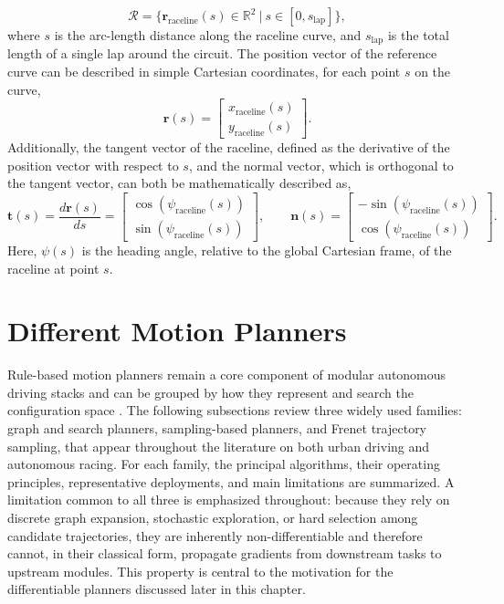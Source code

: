 \begin{equation}
    \mathcal{R} = \{ \textbf{r}_{\text{raceline}}(s) \in \mathbb{R}^2 \ | \ s \in [0, s_{\text{lap}}]\},
\end{equation}
where $s$ is the arc-length distance along the raceline curve, and $s_{\text{lap}}$ is the total length of a single lap around the circuit. 
The position vector of the reference curve can be described in simple Cartesian coordinates, for each point $s$ on the curve,
\begin{equation}
    \textbf{r}(s) = \begin{bmatrix}
        x_{\text{raceline}} (s) \\ y_{\text{raceline}} (s)
    \end{bmatrix}.
\end{equation}
Additionally, the tangent vector of the raceline, defined as the derivative of the position vector with respect to $s$, and the normal vector, which is orthogonal to the tangent vector, can both be mathematically described as,
\begin{equation}
    \textbf{t}(s) = \frac{d \textbf{r}(s)}{d s} = \begin{bmatrix} \cos (  \psi_{\text{raceline}}(s)) \\ \sin (\psi_{\text{raceline}}(s)) \end{bmatrix}, \qquad
    \textbf{n}(s) = \begin{bmatrix} - \sin (\psi_{\text{raceline}}(s)) \\ \cos (\psi_{\text{raceline}}(s)) \end{bmatrix}.
\end{equation}
Here, $\psi(s)$ is the heading angle, relative to the global Cartesian frame, of the raceline at point $s$.

\section{Different Motion Planners}
\label{section:DifferentMotionPlanners}

Rule-based motion planners remain a core component of modular autonomous driving stacks and can be grouped by how they represent and search the configuration space \cite{gonzalez_ReviewMotionPlanning_2016, hu_review_2026, loganathan_systematic_2023}.
The following subsections review three widely used families: graph and search planners, sampling-based planners, and Frenet trajectory sampling, that appear throughout the literature on both urban driving and autonomous racing.
For each family, the principal algorithms, their operating principles, representative deployments, and main limitations are summarized.
A limitation common to all three is emphasized throughout: because they rely on discrete graph expansion, stochastic exploration, or hard selection among candidate trajectories, they are inherently non-differentiable and therefore cannot, in their classical form, propagate gradients from downstream tasks to upstream modules.
This property is central to the motivation for the differentiable planners discussed later in this chapter.

